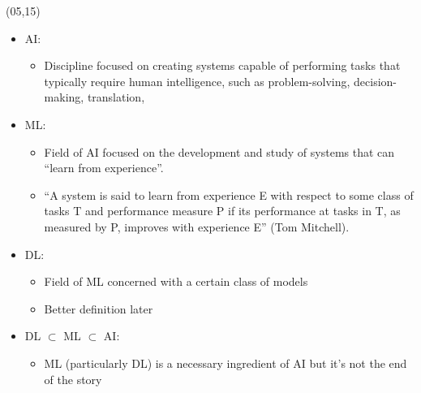 \begin{frame}
  \begin{textblock}{90}(05,15)
    \begin{itemize}
    \item<2-> \acf{AI}:
      \begin{itemize}
      \item Discipline focused on creating systems capable of
        performing tasks that typically require human intelligence, such as
        problem-solving, decision-making, translation, \etc{}
      \end{itemize}
    \item<3-> \acf{ML}:
      \begin{itemize}
      \item Field of \ac{AI} focused on the development and study
        of systems that can ``learn from experience''.
      \item<4-> ``A system is said to learn from experience
        E with respect to some class of tasks T and performance measure P if
        its performance at tasks in T, as measured by P, improves with
        experience E'' (Tom Mitchell).
      \end{itemize}
    \item<5-> \acf{DL}:
      \begin{itemize}
      \item Field of \ac{ML} concerned with a certain class of
      models
      \item Better definition later
      \end{itemize}
    \item<6-> \ac{DL} $\subset$ \ac{ML} $\subset$ \ac{AI}:
      \begin{itemize}
      \item \ac{ML} (particularly \ac{DL}) is a necessary ingredient of \ac{AI}
        but it's not the end of the story
      \end{itemize}
    \end{itemize}
  \end{textblock}

\end{frame}


